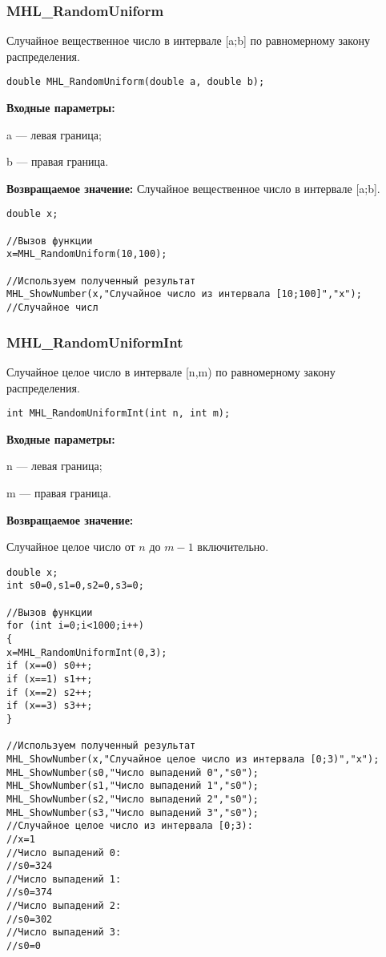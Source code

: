 \documentclass[a4paper,12pt]{article}
\begin{document}
\subsubsection{MHL\_RandomUniform}\label{MHL_RandomUniform}

Случайное вещественное число в интервале [a;b] по равномерному закону распределения.


\begin{lstlisting}[label=code_syntax_MHL_RandomUniform,caption=Синтаксис]
double MHL_RandomUniform(double a, double b);
\end{lstlisting}

\textbf{Входные параметры:}

 a --- левая граница;
  
 b --- правая граница.

\textbf{Возвращаемое значение:}
Случайное вещественное число в интервале [a;b].


\begin{lstlisting}[label=code_use_MHL_RandomUniform,caption=Пример использования]
double x;

//Вызов функции
x=MHL_RandomUniform(10,100);

//Используем полученный результат
MHL_ShowNumber(x,"Случайное число из интервала [10;100]","x");
//Случайное числ
\end{lstlisting}

\subsubsection{MHL\_RandomUniformInt}\label{MHL_RandomUniformInt}

Случайное целое число в интервале [n,m) по равномерному закону распределения.


\begin{lstlisting}[label=code_syntax_MHL_RandomUniformInt,caption=Синтаксис]
int MHL_RandomUniformInt(int n, int m);
\end{lstlisting}

\textbf{Входные параметры:}

n --- левая граница;

 m --- правая граница.

\textbf{Возвращаемое значение:}

Случайное целое число от $n$ до $m-1$ включительно.


\begin{lstlisting}[label=code_use_MHL_RandomUniformInt,caption=Пример использования]
double x;
int s0=0,s1=0,s2=0,s3=0;

//Вызов функции
for (int i=0;i<1000;i++)
{
x=MHL_RandomUniformInt(0,3);
if (x==0) s0++;
if (x==1) s1++;
if (x==2) s2++;
if (x==3) s3++;
}

//Используем полученный результат
MHL_ShowNumber(x,"Случайное целое число из интервала [0;3)","x");
MHL_ShowNumber(s0,"Число выпадений 0","s0");
MHL_ShowNumber(s1,"Число выпадений 1","s0");
MHL_ShowNumber(s2,"Число выпадений 2","s0");
MHL_ShowNumber(s3,"Число выпадений 3","s0");
//Случайное целое число из интервала [0;3):
//x=1
//Число выпадений 0:
//s0=324
//Число выпадений 1:
//s0=374
//Число выпадений 2:
//s0=302
//Число выпадений 3:
//s0=0
\end{lstlisting}
\end{document}
